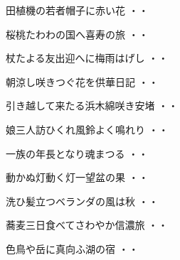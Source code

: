 \begin{shiika}田植機の若者帽子に赤い花
\hfill{・・}\end{shiika}
\vspace{0.6cm}
\begin{shiika}桜桃たわわの国へ喜寿の旅
\hfill{・・}\end{shiika}
\vspace{0.6cm}
\begin{shiika}杖たよる友出迎へに梅雨はげし
\hfill{・・}\end{shiika}
\vspace{0.6cm}
\begin{shiika}朝涼し咲きつぐ花を供華日記
\hfill{・・}\end{shiika}
\vspace{0.6cm}
\begin{shiika}引き越して来たる浜木綿咲き安堵
\hfill{・・}\end{shiika}
\vspace{0.6cm}
\begin{shiika}娘三人訪ひくれ風鈴よく鳴れり
\hfill{・・}\end{shiika}
\vspace{0.6cm}
\begin{shiika}一族の年長となり魂まつる
\hfill{・・}\end{shiika}
\vspace{0.6cm}
\begin{shiika}動かぬ灯動く灯一望盆の果
\hfill{・・}\end{shiika}
\vspace{0.6cm}
\begin{shiika}洗ひ髪立つベランダの風は秋
\hfill{・・}\end{shiika}
\vspace{0.6cm}
\begin{shiika}蕎麦三日食べてさわやか信濃旅
\hfill{・・}\end{shiika}
\vspace{0.6cm}
\begin{shiika}色鳥や岳に真向ふ湖の宿
\hfill{・・}\end{shiika}
\vspace{0.6cm}
